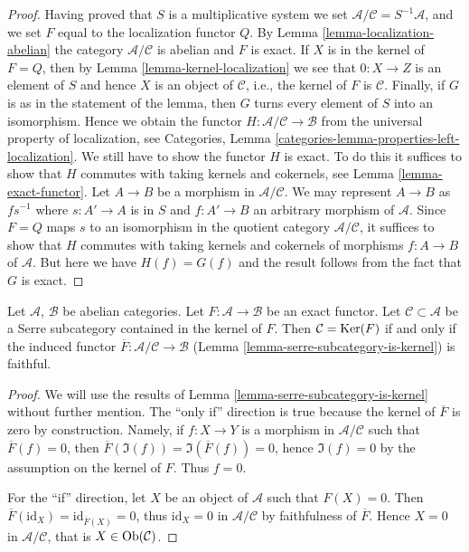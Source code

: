 \begin{proof}
\medskip\noindent
Having proved that $S$ is a multiplicative system we set
$\mathcal{A}/\mathcal{C} = S^{-1}\mathcal{A}$, and we set
$F$ equal to the localization functor $Q$. By
Lemma \ref{lemma-localization-abelian}
the category $\mathcal{A}/\mathcal{C}$ is abelian and $F$ is exact.
If $X$ is in the kernel of $F = Q$, then by
Lemma \ref{lemma-kernel-localization}
we see that $0 : X \to Z$ is an element of $S$ and hence
$X$ is an object of $\mathcal{C}$, i.e., the kernel of
$F$ is $\mathcal{C}$.
Finally, if $G$ is as in the statement of the lemma, then $G$ turns
every element of $S$ into an isomorphism. Hence we obtain the
functor $H : \mathcal{A}/\mathcal{C} \to \mathcal{B}$ from
the universal property of localization, see
Categories, Lemma \ref{categories-lemma-properties-left-localization}.
We still have to show the functor $H$ is exact.
To do this it suffices to show that $H$ commutes
with taking kernels and cokernels, see Lemma \ref{lemma-exact-functor}.
Let $A \to B$ be a morphism in $\mathcal{A}/\mathcal{C}$.
We may represent $A \to B$ as $fs^{-1}$ where $s : A' \to A$
is in $S$ and $f : A' \to B$ an arbitrary morphism of $\mathcal{A}$.
Since $F = Q$ maps $s$ to an isomorphism in the quotient category
$\mathcal{A}/\mathcal{C}$, it suffices to show that $H$ commutes with taking
kernels and cokernels of morphisms $f : A \to B$ of $\mathcal{A}$.
But here we have $H(f) = G(f)$ and the result follows
from the fact that $G$ is exact.
\end{proof}

\begin{lemma}
\label{lemma-quotient-by-kernel-exact-functor}
Let $\mathcal{A}$, $\mathcal{B}$ be abelian categories.
Let $F : \mathcal{A} \to \mathcal{B}$ be an exact functor.
Let $\mathcal{C} \subset \mathcal{A}$ be a Serre subcategory
contained in the kernel of $F$.
Then $\mathcal{C} = \mathop{\mathrm{Ker}}(F)$ if and only if the induced functor
$\overline{F} : \mathcal{A}/\mathcal{C} \to \mathcal{B}$
(Lemma \ref{lemma-serre-subcategory-is-kernel}) is faithful.
\end{lemma}

\begin{proof}
We will use the results of Lemma \ref{lemma-serre-subcategory-is-kernel}
without further mention.
The ``only if'' direction is true because the kernel of $\overline{F}$ is zero
by construction. Namely, if $f : X \to Y$ is a morphism in
$\mathcal{A}/\mathcal{C}$ such that $\overline{F}(f) = 0$, then
$\overline{F}(\Im(f)) = \Im(\overline{F}(f)) = 0$, hence $\Im(f) = 0$ by the
assumption on the kernel of $F$. Thus $f = 0$.

\medskip\noindent
For the ``if'' direction, let $X$ be an object of $\mathcal{A}$ such that $F(X)
= 0$. Then $\overline{F}(\text{id}_X) = \text{id}_{\overline{F}(X)} = 0$, thus
$\text{id}_X = 0$ in $\mathcal{A}/\mathcal{C}$ by faithfulness of
$\overline{F}$. Hence $X = 0$ in $\mathcal{A}/\mathcal{C}$, that is $X \in
\mathop{\mathrm{Ob}}\nolimits(\mathcal{C})$.
\end{proof}






